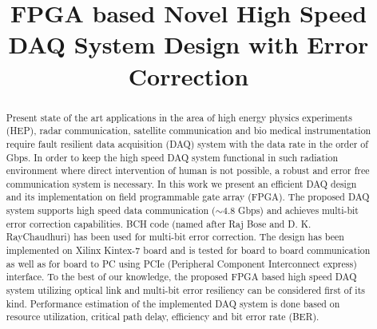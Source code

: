 \documentclass[10pt, conference, compsocconf]{IEEEtran}
\begin{document}
\title{FPGA based Novel High Speed DAQ System Design with Error Correction}










\author{

}


\maketitle
\begin{abstract}


Present state of the art applications in the area of high energy physics experiments (HEP), radar communication, satellite communication and bio medical instrumentation require fault resilient data acquisition (DAQ) system with the data rate in the order of Gbps. In order to keep the high speed DAQ system functional in such radiation environment where direct intervention of human is not possible, a robust and error free communication system is necessary. In this work we present an efficient DAQ design and its implementation on field programmable gate array (FPGA). The proposed DAQ system supports high speed data communication ($ \mathtt{\sim}$4.8 Gbps) and achieves multi-bit error correction capabilities. BCH code (named after Raj Bose and D. K. RayChaudhuri) has been used for multi-bit error correction. The design has been implemented on Xilinx Kintex-7 board and is tested for board to board communication as well as for board to PC using PCIe (Peripheral Component Interconnect express) interface. To the best of our knowledge, the proposed FPGA based high speed DAQ system utilizing optical link and multi-bit error resiliency can be considered first of its kind. Performance estimation of the implemented DAQ system is done based on resource utilization, critical path delay, efficiency and bit error rate (BER).
\end{abstract}
\end{document}
